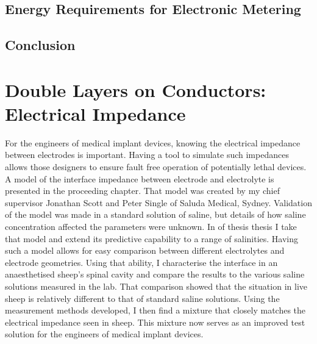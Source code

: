    \chapter{Energy Requirements for Electronic Metering}
     \label{chap:part1_energyHarvestingRequirements}
     


   \chapter{Conclusion}
     \label{chap:part1_conclusion}
     




\part{Double Layers on Conductors: Electrical Impedance}
  \label{part:doubleLayersOnConductors}

  For the engineers of medical implant devices, knowing the electrical impedance between electrodes is important.
  Having a tool to simulate such impedances allows those designers to ensure fault free operation of potentially lethal devices.
  A model of the interface impedance between electrode and electrolyte is presented in the proceeding chapter.
  That model was created by my chief supervisor Jonathan Scott and Peter Single of Saluda Medical, Sydney.
  Validation of the model was made in a standard solution of saline, but details of how saline concentration affected the parameters were unknown.
  In \cref{part:doubleLayersOnConductors} of thesis thesis I take that model and extend its predictive capability to a range of salinities.
  Having such a model allows for easy comparison between different electrolytes and electrode geometries.
  Using that ability, I characterise the interface in an anaesthetised sheep's spinal cavity and compare the results to the various saline solutions measured in the lab.
  That comparison showed that the situation in live sheep is relatively different to that of standard saline solutions.
  Using the measurement methods developed, I then find a mixture that closely matches the electrical impedance seen in sheep.
  This mixture now serves as an improved test solution for the engineers of medical implant devices.


